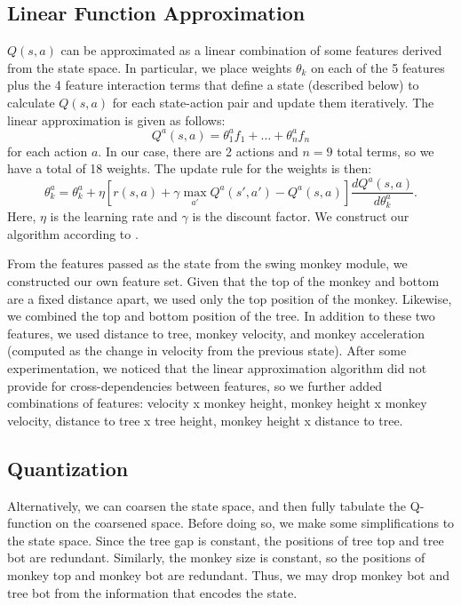 \documentclass[11pt]{article}
\begin{document}
\subsection{Linear Function Approximation}

$Q(s,a)$ can be approximated as a linear combination of some features derived from the state space. In particular, we place weights $\theta_k$ on each of the 5 features plus the 4 feature interaction terms that define a state (described below) to calculate $Q(s,a)$ for each state-action pair and update them iteratively. The linear approximation is given as follows:
$$Q^a(s,a) = \theta^a_1 f_1 + \dots + \theta^a_n f_n$$
for each action $a$. In our case, there are 2 actions and $n=9$ total terms, so we have a total of 18 weights. The update rule for the weights is then:
$$\theta^a_k = \theta^a_k + \eta[r(s,a) + \gamma \max_{a'} Q^a(s',a') - Q^a(s,a)] \frac{dQ^a(s,a)}{d\theta^a_k}.$$ 
Here, $\eta$ is the learning rate and $\gamma$ is the discount factor. We construct our algorithm according to \cite{irodova2005reinforcement}.

From the features passed as the state from the swing monkey module, we constructed our own feature set. Given that the top of the monkey and bottom are a fixed distance apart, we used only the top position of the monkey. Likewise, we combined the top and bottom position of the tree. In addition to these two features, we used distance to tree, monkey velocity, and monkey acceleration (computed as the change in velocity from the previous state). After some experimentation, we noticed that the linear approximation algorithm did not provide for cross-dependencies between features, so we further added combinations of features: velocity x monkey height, monkey height x monkey velocity, distance to tree x tree height, monkey height x distance to tree.

\subsection{Quantization}

Alternatively, we can coarsen the state space, and then fully tabulate the Q-function on the coarsened space. Before doing so, we make some simplifications to the state space. Since the tree gap is constant, the positions of tree top and tree bot are redundant. Similarly, the monkey size is constant, so the positions of monkey top and monkey bot are redundant. Thus, we may drop monkey bot and tree bot from the information that encodes the state. 
\end{document}
